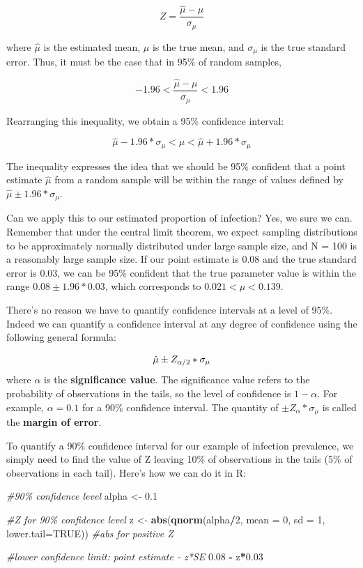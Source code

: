 \documentclass[
]{book}
\newenvironment{Shaded}{\begin{snugshade}}{\end{snugshade}}
\newcommand{\AttributeTok}[1]{\textcolor[rgb]{0.13,0.29,0.53}{#1}}
\newcommand{\CommentTok}[1]{\textcolor[rgb]{0.56,0.35,0.01}{\textit{#1}}}
\newcommand{\ConstantTok}[1]{\textcolor[rgb]{0.56,0.35,0.01}{#1}}
\newcommand{\DecValTok}[1]{\textcolor[rgb]{0.00,0.00,0.81}{#1}}
\newcommand{\FloatTok}[1]{\textcolor[rgb]{0.00,0.00,0.81}{#1}}
\newcommand{\FunctionTok}[1]{\textcolor[rgb]{0.13,0.29,0.53}{\textbf{#1}}}
\newcommand{\NormalTok}[1]{#1}
\newcommand{\OtherTok}[1]{\textcolor[rgb]{0.56,0.35,0.01}{#1}}
\newcommand{\SpecialCharTok}[1]{\textcolor[rgb]{0.81,0.36,0.00}{\textbf{#1}}}
\begin{document}
\[
Z = \frac{\hat{\mu}-\mu}{\sigma_\mu}
\]

where \(\hat{\mu}\) is the estimated mean, \(\mu\) is the true mean, and \(\sigma_\mu\) is the true standard error. Thus, it must be the case that in 95\% of random samples,

\[
-1.96 < \frac{\hat{\mu}-\mu}{\sigma_\mu} < 1.96
\]

Rearranging this inequality, we obtain a 95\% confidence interval:

\[
\hat{\mu} -1.96*\sigma_\mu < \mu < \hat{\mu} +1.96*\sigma_\mu
\]

The inequality expresses the idea that we should be 95\% confident that a point estimate \(\hat{\mu}\) from a random sample will be within the range of values defined by \(\hat{\mu}\pm 1.96*\sigma_\mu\).

Can we apply this to our estimated proportion of infection? Yes, we sure we can. Remember that under the central limit theorem, we expect sampling distributions to be approximately normally distributed under large sample size, and N = 100 is a reasonably large sample size. If our point estimate is 0.08 and the true standard error is 0.03, we can be 95\% confident that the true parameter value is within the range \(0.08\pm 1.96*0.03\), which corresponds to \(0.021 < \mu < 0.139\).

There's no reason we have to quantify confidence intervals at a level of 95\%. Indeed we can quantify a confidence interval at any degree of confidence using the following general formula:

\[
\hat{\mu}\pm Z_{\alpha/2}*\sigma_\mu \\
\]
where \(\alpha\) is the \textbf{significance value}. The significance value refers to the probability of observations in the tails, so the level of confidence is \(1 - \alpha\). For example, \(\alpha = 0.1\) for a 90\% confidence interval. The quantity of \(\pm Z_{\alpha}*\sigma_\mu\) is called the \textbf{margin of error}.

To quantify a 90\% confidence interval for our example of infection prevalence, we simply need to find the value of Z leaving 10\% of observations in the tails (5\% of observations in each tail). Here's how we can do it in R:

\begin{Shaded}
\begin{Highlighting}[]
\CommentTok{\#90\% confidence level}
\NormalTok{alpha }\OtherTok{\textless{}{-}} \FloatTok{0.1}

\CommentTok{\#Z for 90\% confidence level}
\NormalTok{z }\OtherTok{\textless{}{-}} \FunctionTok{abs}\NormalTok{(}\FunctionTok{qnorm}\NormalTok{(alpha}\SpecialCharTok{/}\DecValTok{2}\NormalTok{, }\AttributeTok{mean =} \DecValTok{0}\NormalTok{, }\AttributeTok{sd =} \DecValTok{1}\NormalTok{, }\AttributeTok{lower.tail=}\ConstantTok{TRUE}\NormalTok{)) }\CommentTok{\#abs for positive Z}

\CommentTok{\#lower confidence limit: point estimate {-} z*SE}
\FloatTok{0.08} \SpecialCharTok{{-}}\NormalTok{ z}\SpecialCharTok{*}\FloatTok{0.03}
\end{Highlighting}
\end{Shaded}
\end{document}
